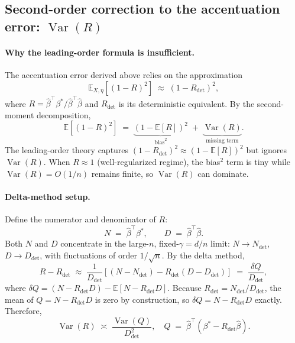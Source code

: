 
\subsection{Second-order correction to the accentuation error: $\operatorname{Var}(R)$}

\paragraph{Why the leading-order formula is insufficient.}

The accentuation error derived above relies on the approximation
\begin{equation}
  \mathbb{E}_{X,\eta}\!\left[\left(1-R\right)^{2}\right]
  \;\approx\;
  \left(1-R_{\det}\right)^{2},
  \label{eq:acc_leading}
\end{equation}
where $R = \hat{\beta}^{\top}\beta^{*}/\hat{\beta}^{\top}\hat{\beta}$ and
$R_{\det}$ is its deterministic equivalent.  By the second-moment
decomposition,
\begin{equation}
  \mathbb{E}\!\left[(1-R)^{2}\right]
  \;=\;
  \underbrace{(1-\mathbb{E}[R])^{2}}_{\text{bias}^{2}}
  \;+\;
  \underbrace{\operatorname{Var}(R)}_{\text{missing term}}.
  \label{eq:var_decomp}
\end{equation}
The leading-order theory captures $(1-R_{\det})^{2}\approx(1-\mathbb{E}[R])^{2}$
but ignores $\operatorname{Var}(R)$.  When $R\approx 1$
(well-regularized regime), the bias$^{2}$ term is tiny while
$\operatorname{Var}(R)=O(1/n)$ remains finite, so $\operatorname{Var}(R)$
can dominate.

\paragraph{Delta-method setup.}

Define the numerator and denominator of $R$:
\[
  N \;=\; \hat{\beta}^{\top}\beta^{*},
  \qquad
  D \;=\; \hat{\beta}^{\top}\hat{\beta}.
\]
Both $N$ and $D$ concentrate in the large-$n$, fixed-$\gamma=d/n$ limit:
$N\to N_{\det}$, $D\to D_{\det}$, with fluctuations of order $1/\sqrt{n}$.
By the delta method,
\begin{equation}
  R - R_{\det}
  \;\approx\;
  \frac{1}{D_{\det}}\left[(N-N_{\det}) - R_{\det}(D-D_{\det})\right]
  \;=\;
  \frac{\delta Q}{D_{\det}},
  \label{eq:deltaR}
\end{equation}
where $\delta Q = (N - R_{\det}D) - \mathbb{E}[N-R_{\det}D]$.
Because $R_{\det}=N_{\det}/D_{\det}$, the mean of $Q=N-R_{\det}D$ is
zero by construction, so $\delta Q = N - R_{\det}D$ exactly.
Therefore,
\begin{equation}
  \operatorname{Var}(R)
  \;\asymp\;
  \frac{\operatorname{Var}(Q)}{D_{\det}^{2}},
  \quad
  Q \;=\; \hat{\beta}^{\top}(\beta^{*} - R_{\det}\hat{\beta}).
  \label{eq:varR_via_Q}
\end{equation}


